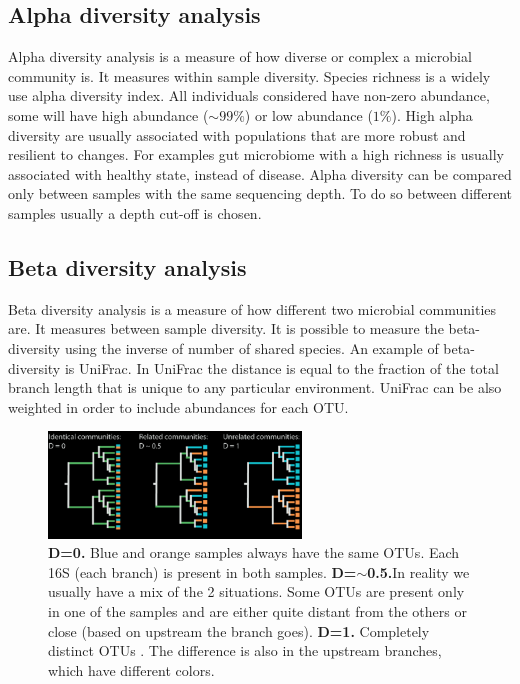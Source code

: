   \subsection{Alpha diversity analysis}
  Alpha diversity analysis is a measure of how diverse or complex a microbial community is.
  It measures within sample diversity.
  Species richness is a widely use alpha diversity index.
  All individuals considered have non-zero abundance, some will have high abundance ($\sim99\%$) or low abundance ($1\%$).
  High alpha diversity are usually associated with populations that are more robust and resilient to changes.
  For examples gut microbiome with a high richness is usually associated with healthy state, instead of disease.
  Alpha diversity can be compared only between samples with the same sequencing depth.
  To do so between different samples usually a depth cut-off is chosen.

  \subsection{Beta diversity analysis}
  Beta diversity analysis is a measure of how different two microbial communities are.
  It measures between sample diversity.
  It is possible to measure the beta-diversity using the inverse of number of shared species.
  An example of beta-diversity is UniFrac.
  In UniFrac the distance is equal to the fraction of the total branch length that is unique to any particular environment.
  UniFrac can be also weighted in order to include abundances for each OTU.

  \begin{figure}[h]
    \centering
    \includegraphics[width=0.6\textwidth]{UniFrac.png}
    \caption{\textbf{D=0.} Blue and orange samples always have the same OTUs. Each 16S (each branch) is present in both samples. \textbf{D=$\sim$0.5.}In reality we usually have a mix of the 2 situations. Some OTUs are present only in one of the samples and are either quite distant from the others or close (based on upstream the branch goes). \textbf{D=1.} Completely distinct OTUs . The difference is also in the upstream branches, which have different colors.}
  \end{figure}

